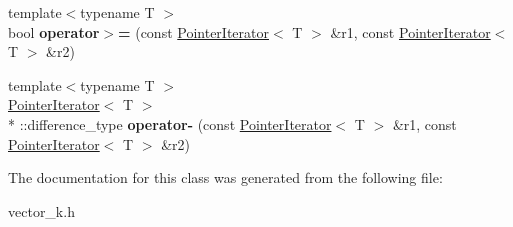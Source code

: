 \begin{DoxyCompactItemize}
\item 
\hypertarget{classkeycpp_1_1_pointer_iterator_a7a58bf216a9bd8b4a4cfd2905a421b8c}{{\footnotesize template$<$typename T $>$ }\\bool {\bfseries operator$>$=} (const \hyperlink{classkeycpp_1_1_pointer_iterator}{Pointer\-Iterator}$<$ T $>$ \&r1, const \hyperlink{classkeycpp_1_1_pointer_iterator}{Pointer\-Iterator}$<$ T $>$ \&r2)}\label{classkeycpp_1_1_pointer_iterator_a7a58bf216a9bd8b4a4cfd2905a421b8c}

\item 
\hypertarget{classkeycpp_1_1_pointer_iterator_a0c82b8711579ffa15e4ec6f8952e7bda}{{\footnotesize template$<$typename T $>$ }\\\hyperlink{classkeycpp_1_1_pointer_iterator}{Pointer\-Iterator}$<$ T $>$\\*
\-::difference\-\_\-type {\bfseries operator-\/} (const \hyperlink{classkeycpp_1_1_pointer_iterator}{Pointer\-Iterator}$<$ T $>$ \&r1, const \hyperlink{classkeycpp_1_1_pointer_iterator}{Pointer\-Iterator}$<$ T $>$ \&r2)}\label{classkeycpp_1_1_pointer_iterator_a0c82b8711579ffa15e4ec6f8952e7bda}

\end{DoxyCompactItemize}


The documentation for this class was generated from the following file\-:\begin{DoxyCompactItemize}
\item 
vector\-\_\-k.\-h\end{DoxyCompactItemize}
